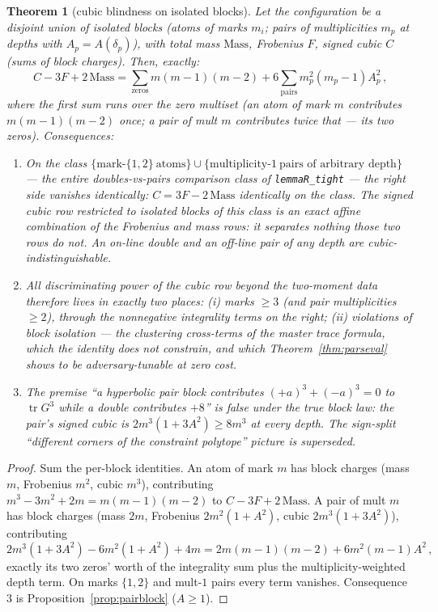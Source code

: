 \documentclass[11pt]{article}
\theoremstyle{plain}
\newtheorem{theorem}{Theorem}[section]
\theoremstyle{definition}
\theoremstyle{remark}
\newcommand{\tr}{\operatorname{tr}}
\begin{document}
\begin{theorem}[cubic blindness on isolated blocks]
\label{thm:blind}
Let the configuration be a disjoint union of isolated blocks (atoms of marks
$m_i$; pairs of multiplicities $m_p$ at depths with $A_p = A(\delta_p)$), with
total mass $\mathrm{Mass}$, Frobenius $F$, signed cubic $C$ (sums of block
charges). Then, exactly:
\[
  C - 3F + 2\,\mathrm{Mass}
  = \sum_{\mathrm{zeros}} m(m-1)(m-2)
    + 6 \sum_{\mathrm{pairs}} m_p^2 (m_p - 1) A_p^2 \,,
\]
where the first sum runs over the zero multiset (an atom of mark $m$ contributes
$m(m-1)(m-2)$ once; a pair of mult $m$ contributes twice that --- its two zeros).
Consequences:
\begin{enumerate}
\item On the class $\{\text{mark-}\{1,2\}\ \text{atoms}\} \cup
  \{\text{multiplicity-}1\ \text{pairs of arbitrary depth}\}$ --- the entire
  doubles-vs-pairs comparison class of \texttt{lemmaR\_tight} --- the right side
  vanishes identically: $C = 3F - 2\,\mathrm{Mass}$ identically on the
  class. The signed cubic row restricted to isolated blocks of this class is an
  exact affine combination of the Frobenius and mass rows: it separates nothing
  those two rows do not. An on-line double and an off-line pair of any depth are
  cubic-indistinguishable.
\item All discriminating power of the cubic row beyond the two-moment data
  therefore lives in exactly two places: (i) marks $\ge 3$ (and pair
  multiplicities $\ge 2$), through the nonnegative integrality terms on the
  right; (ii) violations of block isolation --- the clustering cross-terms of the
  master trace formula, which the identity does not constrain, and which
  Theorem~\ref{thm:parseval} shows to be adversary-tunable at zero cost.
\item The premise ``a hyperbolic pair block contributes $(+a)^3 + (-a)^3 = 0$ to
  $\tr G^3$ while a double contributes $+8$'' is false under the true block law:
  the pair's signed cubic is $2m^3(1 + 3A^2) \ge 8m^3$ at every depth. The
  sign-split ``different corners of the constraint polytope'' picture is
  superseded.
\end{enumerate}
\end{theorem}

\begin{proof}
Sum the per-block identities. An atom of mark $m$ has block charges
(mass $m$, Frobenius $m^2$, cubic $m^3$), contributing
$m^3 - 3m^2 + 2m = m(m-1)(m-2)$ to $C - 3F + 2\,\mathrm{Mass}$. A pair of mult
$m$ has block charges (mass $2m$, Frobenius $2m^2(1 + A^2)$, cubic
$2m^3(1 + 3A^2)$), contributing
\[
  2m^3(1 + 3A^2) - 6m^2(1 + A^2) + 4m
  = 2m(m-1)(m-2) + 6m^2(m-1)A^2 \,,
\]
exactly its two zeros' worth of the integrality sum plus the
multiplicity-weighted depth term. On marks $\{1,2\}$ and mult-$1$ pairs every
term vanishes. Consequence 3 is Proposition~\ref{prop:pairblock} ($A \ge 1$).
\end{proof}
\end{document}
